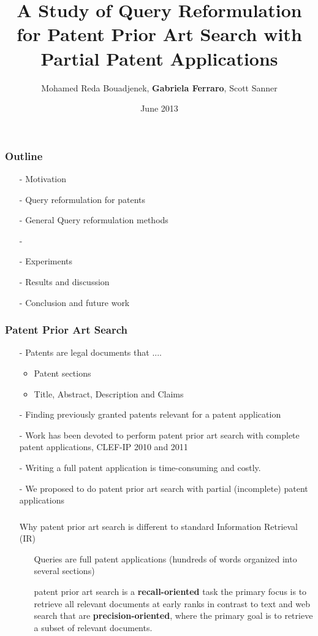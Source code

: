 \documentclass[xcolor=dvipsnames]{beamer}
\title{A Study of Query Reformulation for Patent Prior Art Search with Partial Patent Applications}
\author{Mohamed Reda Bouadjenek, \textbf{Gabriela Ferraro}, Scott Sanner}
\date{June 2013}
\begin{document}
\def\newblock{\hskip .11em plus .33em minus .07em}
\frame{\titlepage}


\begin{frame}
\frametitle{Outline}
\begin{itemize}
\item[-] Motivation
\item[-] Query reformulation for patents
\item[-] General Query reformulation methods
\item[-] 
\item[-] Experiments 
\item[-] Results and discussion
\item[-] Conclusion and future work
\end{itemize}
\end{frame}


\begin{frame}
\frametitle{Patent Prior Art Search}

\begin{itemize}
\item[-] Patents are legal documents that ....
	\begin{itemize}
		\item Patent sections 
		\item Title, Abstract, Description and Claims				
	\end{itemize}

\item[-] Finding previously granted patents relevant for a patent application

\item[-] Work has been devoted to perform patent prior art search with complete patent applications, CLEF-IP 2010 and 2011
\item[-] Writing a full patent application is time-consuming and costly.

\item[-] We proposed to do patent prior art search with partial (incomplete) patent applications
\end{itemize}
\end{frame}


\begin{frame}
\frametitle{}
\begin{itemize}
\item[] Why patent prior art search is different to standard Information Retrieval (IR)
  \begin{itemize}
  \item[] Queries are full patent applications (hundreds of words organized into several sections)  	
  \item[] patent prior art search is a \textbf{recall-oriented} task
  	the primary focus is to retrieve all relevant documents at early ranks
  		in contrast to text and web search that are \textbf{precision-oriented}, where the primary goal is to retrieve a subset of relevant documents.
  \end{itemize}
\end{itemize}
\end{frame}
\end{document}
